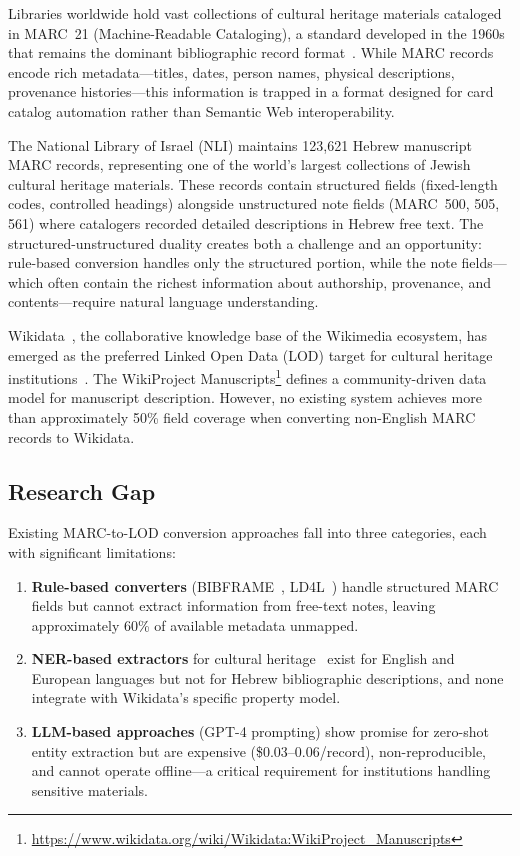 \documentclass[Afour,sageh,times]{sagej}
\begin{document}
Libraries worldwide hold vast collections of cultural heritage materials cataloged in MARC~21 (Machine-Readable Cataloging), a standard developed in the 1960s that remains the dominant bibliographic record format~\cite{loc-marc}. While MARC records encode rich metadata---titles, dates, person names, physical descriptions, provenance histories---this information is trapped in a format designed for card catalog automation rather than Semantic Web interoperability.

The National Library of Israel (NLI) maintains 123,621 Hebrew manuscript MARC records, representing one of the world's largest collections of Jewish cultural heritage materials. These records contain structured fields (fixed-length codes, controlled headings) alongside unstructured note fields (MARC~500, 505, 561) where catalogers recorded detailed descriptions in Hebrew free text. The structured-unstructured duality creates both a challenge and an opportunity: rule-based conversion handles only the structured portion, while the note fields---which often contain the richest information about authorship, provenance, and contents---require natural language understanding.

Wikidata~\cite{vrandecic2014wikidata}, the collaborative knowledge base of the Wikimedia ecosystem, has emerged as the preferred Linked Open Data (LOD) target for cultural heritage institutions~\cite{van2020wikidata}. The WikiProject Manuscripts\footnote{\url{https://www.wikidata.org/wiki/Wikidata:WikiProject_Manuscripts}} defines a community-driven data model for manuscript description. However, no existing system achieves more than approximately 50\% field coverage when converting non-English MARC records to Wikidata.

\subsection{Research Gap}

Existing MARC-to-LOD conversion approaches fall into three categories, each with significant limitations:

\begin{enumerate}[leftmargin=*]
\item \textbf{Rule-based converters} (BIBFRAME~\cite{mcallister2017bibframe}, LD4L~\cite{cornell-ld4l}) handle structured MARC fields but cannot extract information from free-text notes, leaving approximately 60\% of available metadata unmapped.
\item \textbf{NER-based extractors} for cultural heritage~\cite{ehrmann2023named} exist for English and European languages but not for Hebrew bibliographic descriptions, and none integrate with Wikidata's specific property model.
\item \textbf{LLM-based approaches} (GPT-4 prompting) show promise for zero-shot entity extraction but are expensive (\$0.03--0.06/record), non-reproducible, and cannot operate offline---a critical requirement for institutions handling sensitive materials.
\end{enumerate}
\end{document}
